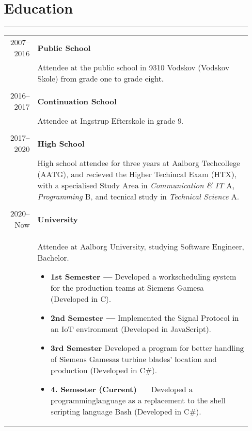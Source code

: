 \documentclass{article}
\begin{document}
\section*{Education}
\hrule width5cm
\begin{longtabu} to \textwidth {r|X}
2007--2016 & \textbf{Public School}\\
&   Attendee at the public school in 9310 Vodskov (Vodskov Skole) from grade one to grade eight.
    \\\\
2016--2017 & \textbf{Continuation School}\\
&   Attendee at Ingstrup Efterskole in grade 9.
    \\\\
2017--2020 & \textbf{High School}\\
&   High school attendee for three years at Aalborg Techcollege (AATG), and recieved the Higher
        Techincal Exam (HTX), with a specialised Study Area in \textit{Communication \& IT} A,
        \textit{Programming} B, and tecnical study in \textit{Technical Science} A. \\\\
2020--Now & \textbf{University}\\
&   Attendee at Aalborg University, studying Software Engineer, Bachelor.
    \begin{itemize}
        \item[] \textbf{1st Semester --- } Developed a workscheduling system for the production
            teams at Siemens Gamesa (Developed in C).
        \item[] \textbf{2nd Semester --- } Implemented the Signal Protocol in an IoT environment
            (Developed in JavaScript).
        \item[] \textbf{3rd Semester} Developed a program for better handling of
            Siemens Gamesas turbine blades' location and production (Developed in C\#).
        \item[] \textbf{4. Semester (Current) --- } Developed a programminglanguage as a replacement to the shell scripting language Bash (Developed in C\#).
    \end{itemize}
\end{longtabu}
 
\end{document}
